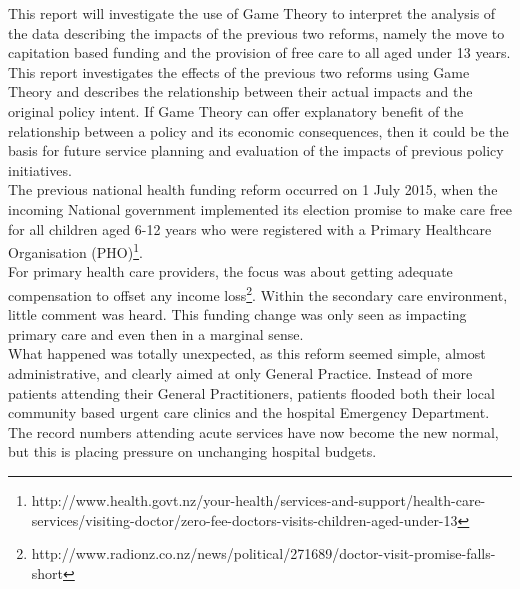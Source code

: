 \documentclass[11pt,a4paper]{article}
\begin{document}
This report will investigate the use of Game Theory to interpret the analysis of the data describing the impacts of the previous two reforms, namely the move to capitation based funding and the provision of  free care to all aged under 13 years. This report investigates the effects of the previous two reforms using Game Theory and describes the relationship between their actual impacts and the original policy intent. If Game Theory can offer explanatory benefit of the relationship between a policy and its economic consequences, then it could be the basis for future service planning and evaluation of the impacts of previous policy initiatives.\\ 


The previous national health funding reform occurred on 1 July 2015, when the incoming National government implemented its election promise to make care free for all children aged 6-12 years who were registered with a Primary Healthcare Organisation (PHO)\footnote{http://www.health.govt.nz/your-health/services-and-support/health-care-services/visiting-doctor/zero-fee-doctors-visits-children-aged-under-13}.\\


For primary health care providers, the focus was about getting adequate compensation to offset any income loss\footnote{http://www.radionz.co.nz/news/political/271689/doctor-visit-promise-falls-short}. Within the secondary care environment, little comment was heard. This funding change was only seen as impacting primary care and even then in a marginal sense.\\


What happened was totally unexpected, as this reform seemed simple, almost administrative, and clearly aimed at only General Practice. Instead of more patients attending their General Practitioners, patients flooded both their local community based urgent care clinics and the hospital Emergency Department. The record numbers attending acute services have now become the new normal, but this is placing pressure on unchanging hospital budgets. \\
\end{document}
